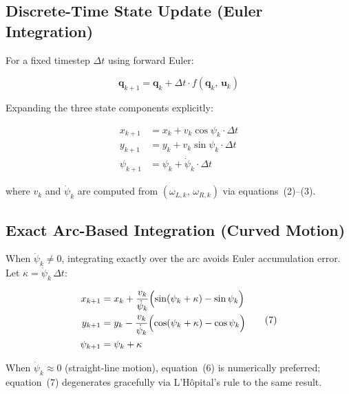 \documentclass[12pt,a4paper]{article}
\newcommand{\q}{\mathbf{q}}
\newcommand{\bu}{\mathbf{u}}
\begin{document}
\subsection{Discrete-Time State Update (Euler Integration)}

For a fixed timestep $\Delta t$ using forward Euler:

\begin{equation}
  \q_{k+1} = \q_k + \Delta t \cdot f(\q_k,\,\bu_k)
  \tag{5}
\end{equation}

Expanding the three state components explicitly:

\begin{equation}
  \begin{aligned}
    x_{k+1}   &= x_k   + v_k \cos\psi_k \cdot \Delta t \\
    y_{k+1}   &= y_k   + v_k \sin\psi_k \cdot \Delta t \\
    \psi_{k+1} &= \psi_k + \dot{\psi}_k  \cdot \Delta t
  \end{aligned}
  \tag{6}
\end{equation}

where $v_k$ and $\dot\psi_k$ are computed from
$(\omega_{L,k},\,\omega_{R,k})$ via equations~(2)--(3).

\subsection{Exact Arc-Based Integration (Curved Motion)}

When $\dot\psi_k \neq 0$, integrating exactly over the arc avoids
Euler accumulation error. Let $\kappa = \dot\psi_k\,\Delta t$:

\begin{equation}
  \begin{aligned}
    x_{k+1}   &= x_k + \frac{v_k}{\dot{\psi}_k}
                  \Bigl(\sin(\psi_k+\kappa) - \sin\psi_k\Bigr) \\
    y_{k+1}   &= y_k - \frac{v_k}{\dot{\psi}_k}
                  \Bigl(\cos(\psi_k+\kappa) - \cos\psi_k\Bigr) \\
    \psi_{k+1} &= \psi_k + \kappa
  \end{aligned}
  \tag{7}
\end{equation}

When $\dot\psi_k \approx 0$ (straight-line motion), equation~(6) is
numerically preferred; equation~(7) degenerates gracefully via
L'H\^{o}pital's rule to the same result.
\end{document}
